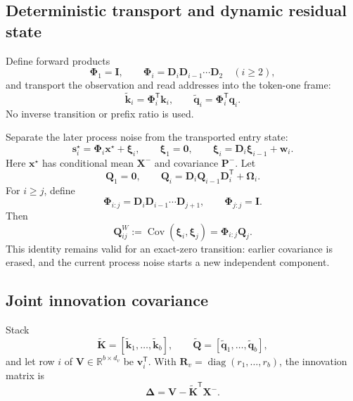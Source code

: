 \documentclass[11pt]{article}
\newcommand{\ve}[1]{\boldsymbol{#1}}
\newcommand{\tr}{\mathsf{T}}
\newcommand{\R}{\mathbb{R}}
\DeclareMathOperator{\diag}{diag}
\DeclareMathOperator{\Cov}{Cov}
\begin{document}
\subsection{Deterministic transport and dynamic residual state}

Define forward products
\begin{equation}
  \ve{\Phi}_1=\ve{I},
  \qquad
  \ve{\Phi}_i=\ve{D}_i\ve{D}_{i-1}\cdots\ve{D}_2
  \quad(i\geq2),
  \label{eq:phi}
\end{equation}
and transport the observation and read addresses into the token-one frame:
\begin{equation}
  \widetilde{\ve{k}}_i=\ve{\Phi}_i^{\tr}\ve{k}_i,
  \qquad
  \widetilde{\ve{q}}_i=\ve{\Phi}_i^{\tr}\ve{q}_i.
  \label{eq:transported-addresses}
\end{equation}
No inverse transition or prefix ratio is used.

Separate the later process noise from the transported entry state:
\begin{equation}
  \ve{s}_i^\star
  =\ve{\Phi}_i\ve{x}^\star+\ve{\xi}_i,
  \qquad
  \ve{\xi}_1=\ve{0},
  \qquad
  \ve{\xi}_i=\ve{D}_i\ve{\xi}_{i-1}+\ve{w}_i .
  \label{eq:state-decomposition}
\end{equation}
Here $\ve{x}^\star$ has conditional mean $\ve{X}^-$ and covariance $\ve{P}^-$.  Let
\begin{equation}
  \ve{Q}_1=\ve{0},
  \qquad
  \ve{Q}_i
  =\ve{D}_i\ve{Q}_{i-1}\ve{D}_i^{\tr}+\ve{\Omega}_i .
  \label{eq:dynamic-q}
\end{equation}
For $i\geq j$, define
\begin{equation}
  \ve{\Phi}_{i:j}=\ve{D}_i\ve{D}_{i-1}\cdots\ve{D}_{j+1},
  \qquad
  \ve{\Phi}_{j:j}=\ve{I}.
\end{equation}
Then
\begin{equation}
  \ve{Q}_{ij}^{W}
  :=\Cov(\ve{\xi}_i,\ve{\xi}_j)
  =\ve{\Phi}_{i:j}\ve{Q}_j .
  \label{eq:cross-time-q}
\end{equation}
This identity remains valid for an exact-zero transition: earlier covariance is erased, and the
current process noise starts a new independent component.

\subsection{Joint innovation covariance}

Stack
\begin{equation}
  \widetilde{\ve{K}}
  =[\widetilde{\ve{k}}_1,\ldots,\widetilde{\ve{k}}_b],
  \qquad
  \widetilde{\ve{Q}}
  =[\widetilde{\ve{q}}_1,\ldots,\widetilde{\ve{q}}_b],
\end{equation}
and let row $i$ of $\ve{V}\in\R^{b\times d_v}$ be $\ve{v}_i^{\tr}$.  With
$\ve{R}_v=\diag(r_1,\ldots,r_b)$, the innovation matrix is
\begin{equation}
  \ve{\Delta}
  =\ve{V}-\widetilde{\ve{K}}^{\tr}\ve{X}^-.
  \label{eq:panel-innovation}
\end{equation}
\end{document}
